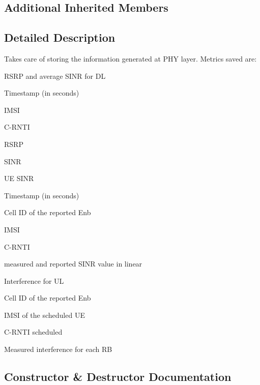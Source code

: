 \subsection*{Additional Inherited Members}


\subsection{Detailed Description}
Takes care of storing the information generated at P\+HY layer. Metrics saved are\+:
\begin{DoxyItemize}
\item R\+S\+RP and average S\+I\+NR for DL
\begin{DoxyItemize}
\item Timestamp (in seconds)
\item I\+M\+SI
\item C-\/\+R\+N\+TI
\item R\+S\+RP
\item S\+I\+NR
\end{DoxyItemize}
\item UE S\+I\+NR
\begin{DoxyItemize}
\item Timestamp (in seconds)
\item Cell ID of the reported Enb
\item I\+M\+SI
\item C-\/\+R\+N\+TI
\item measured and reported S\+I\+NR value in linear
\end{DoxyItemize}
\item Interference for UL
\begin{DoxyItemize}
\item Cell ID of the reported Enb
\item I\+M\+SI of the scheduled UE
\item C-\/\+R\+N\+TI scheduled
\item Measured interference for each RB 
\end{DoxyItemize}
\end{DoxyItemize}

\subsection{Constructor \& Destructor Documentation}
